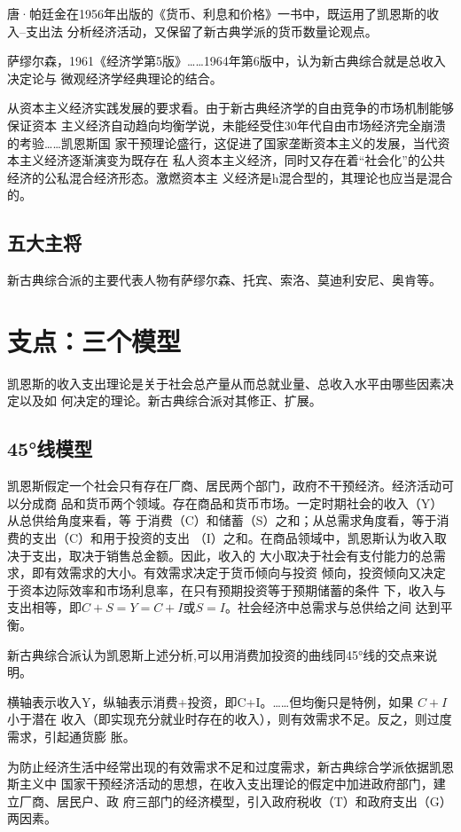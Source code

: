 唐·帕廷金在1956年出版的《货币、利息和价格》一书中，既运用了凯恩斯的收入--支出法
分析经济活动，又保留了新古典学派的货币数量论观点。

萨缪尔森，1961《经济学第5版》……1964年第6版中，认为新古典综合就是总收入决定论与
微观经济学经典理论的结合。

从资本主义经济实践发展的要求看。由于新古典经济学的自由竞争的市场机制能够保证资本
主义经济自动趋向均衡学说，未能经受住30年代自由市场经济完全崩溃的考验……凯恩斯国
家干预理论盛行，这促进了国家垄断资本主义的发展，当代资本主义经济逐渐演变为既存在
私人资本主义经济，同时又存在着“社会化”的公共经济的公私混合经济形态。激燃资本主
义经济是h混合型的，其理论也应当是混合的。
\subsection{五大主将}

新古典综合派的主要代表人物有萨缪尔森、托宾、索洛、莫迪利安尼、奥肯等。

\section{支点：三个模型}

凯恩斯的收入支出理论是关于社会总产量从而总就业量、总收入水平由哪些因素决定以及如
何决定的理论。新古典综合派对其修正、扩展。

\subsection{\ang{45}线模型}

凯恩斯假定一个社会只有存在厂商、居民两个部门，政府不干预经济。经济活动可以分成商
品和货币两个领域。存在商品和货币市场。一定时期社会的收入（Y）从总供给角度来看，等
于消费（C）和储蓄（S）之和；从总需求角度看，等于消费的支出（C）和用于投资的支出
（I）之和。在商品领域中，凯恩斯认为收入取决于支出，取决于销售总金额。因此，收入的
大小取决于社会有支付能力的总需求，即有效需求的大小。有效需求决定于货币倾向与投资
倾向，投资倾向又决定于资本边际效率和市场利息率，在只有预期投资等于预期储蓄的条件
下，收入与支出相等，即$C + S = Y = C + I$或$S = I$。社会经济中总需求与总供给之间
达到平衡。

新古典综合派认为凯恩斯上述分析,可以用消费加投资的曲线同\ang{45}线的交点来说明。

横轴表示收入Y，纵轴表示消费+投资，即C+I。……但均衡只是特例，如果 $C+I$ 小于潜在
收入（即实现充分就业时存在的收入），则有效需求不足。反之，则过度需求，引起通货膨
胀。

为防止经济生活中经常出现的有效需求不足和过度需求，新古典综合学派依据凯恩斯主义中
国家干预经济活动的思想，在收入支出理论的假定中加进政府部门，建立厂商、居民户、政
府三部门的经济模型，引入政府税收（T）和政府支出（G）两因素。

